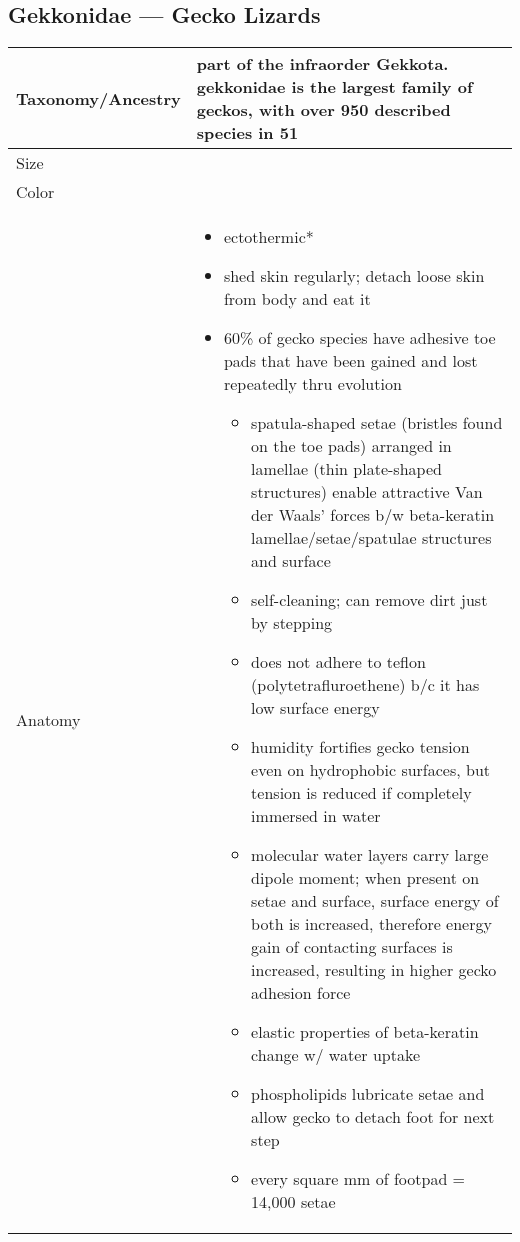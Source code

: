 \subsection{Gekkonidae --- Gecko Lizards}
\begin{center}
\begin{longtabu} to 

	\hline
	Taxonomy/Ancestry &
	part of the infraorder Gekkota. gekkonidae is the largest family of geckos, with over 950 described species in 51 
	
	 \\
	\hline
	Size & 
	
	\\
	\hline
	Color &
	
	 \\
	\hline
	Anatomy &
	\begin{itemize}[noitemsep]
		\item ectothermic*
		\item shed skin regularly; detach loose skin from body and eat it
		\item 60\% of gecko species have adhesive toe pads that have been gained and lost repeatedly thru evolution
			\begin{itemize}[noitemsep]
				\item spatula-shaped setae (bristles found on the toe pads) arranged in lamellae (thin plate-shaped structures) enable attractive Van der Waals' forces b/w beta-keratin lamellae/setae/spatulae structures and surface
				\item self-cleaning; can remove dirt just by stepping
				\item does not adhere to teflon (polytetrafluroethene) b/c it has low surface energy
				\item humidity fortifies gecko tension even on hydrophobic surfaces, but tension is reduced if completely immersed in water
				\item molecular water layers carry large dipole moment; when present on setae and surface, surface energy of both is increased, therefore energy gain of contacting surfaces is increased, resulting in higher gecko adhesion force
				\item elastic properties of beta-keratin change w/ water uptake
				\item phospholipids lubricate setae and allow gecko to detach foot for next step
				\item every square mm of footpad = 14,000 setae

\end{itemize}
\end{itemize}
\end{longtabu}
\end{center}
